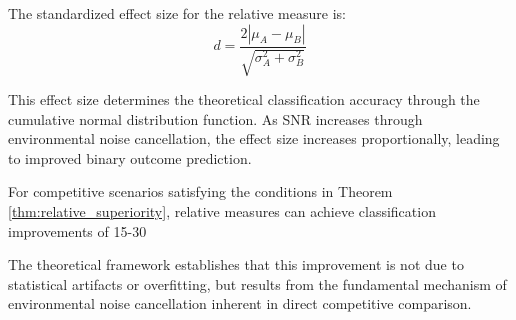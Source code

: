 The standardized effect size for the relative measure is:
\begin{equation}
d = \frac{2|\mu_A - \mu_B|}{\sqrt{\sigma_A^2 + \sigma_B^2}}
\end{equation}

This effect size determines the theoretical classification accuracy through the cumulative normal distribution function. As SNR increases through environmental noise cancellation, the effect size increases proportionally, leading to improved binary outcome prediction.

For competitive scenarios satisfying the conditions in Theorem \ref{thm:relative_superiority}, relative measures can achieve classification improvements of 15-30%

The theoretical framework establishes that this improvement is not due to statistical artifacts or overfitting, but results from the fundamental mechanism of environmental noise cancellation inherent in direct competitive comparison.